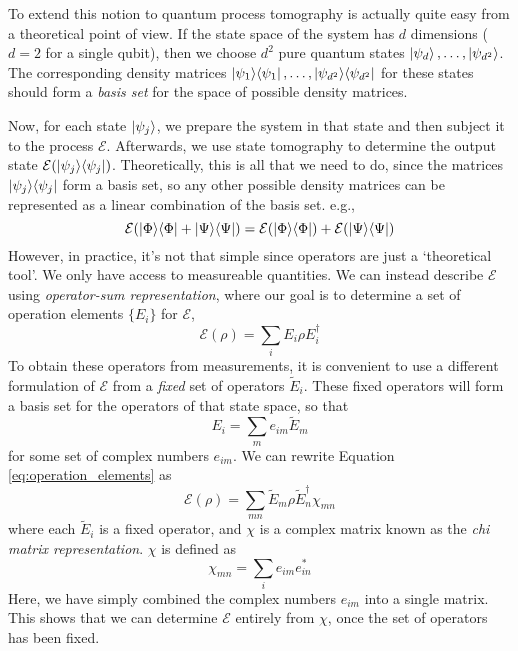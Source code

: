To extend this notion to quantum process tomography is actually quite easy from a theoretical point
of view. If the state space of the system has $d$ dimensions ($d = 2$ for a single qubit), then we
choose $d^2$ pure quantum states $\ket{\psi_d}, \dots, \ket{\psi_{d^2}}$. The corresponding density
matrices $\ket{\psi_1}\!\bra{\psi_1}, \dots, \ket{\psi_{d^2}}\!\bra{\psi_{d^2}}$ for these states should
form a \textit{basis set} for the space of possible density matrices. 

Now, for each state $\ket{\psi_j}$, we prepare the system in that state and then subject it to the
process $\mathcal{E}$. Afterwards, we use state tomography to determine the output state
$\mathcal{E}(\ket{\psi_j}\!\bra{\psi_j})$. Theoretically, this is all that we need to do, since the
matrices $\ket{\psi_j}\!\bra{\psi_j}$ form a basis set, so any other possible density matrices can be
represented as a linear combination of the basis set. e.g.,
\begin{equation}
    \mathcal{E}(\ket{\Phi}\!\bra{\Phi} + \ket{\Psi}\!\bra{\Psi}) = 
    \mathcal{E}(\ket{\Phi}\!\bra{\Phi}) + \mathcal{E}(\ket{\Psi}\!\bra{\Psi})
\end{equation}
However, in practice, it's not that simple since operators are just a `theoretical tool'. We only
have access to measureable quantities. We can instead describe $\mathcal{E}$ using
\textit{operator-sum representation}, where our goal is to determine a set of operation elements
$\{E_i\}$ for $\mathcal{E}$,
\begin{equation} \label{eq:operation_elements}
    \mathcal{E}(\rho) = \sum_i E_i \rho E_i^{\dagger} 
\end{equation}
To obtain these operators from measurements, it is convenient to use a different formulation of
$\mathcal{E}$ from a \textit{fixed} set of operators $\tilde{E}_i$. These fixed operators will form
a basis set for the operators of that state space, so that
\begin{equation}
    E_i = \sum_m e_{im} \tilde{E}_m
\end{equation}
for some set of complex numbers $e_{im}$. We can rewrite Equation \ref{eq:operation_elements} as
\begin{equation} \label{eq:chi_matrix_representation}
    \mathcal{E}(\rho) = \sum_{mn} \tilde{E}_m \rho \tilde{E}_n^{\dagger} \chi_{mn}
\end{equation}
where each $\tilde{E}_i$ is a fixed operator, and $\chi$ is a complex matrix known as the
\textit{chi matrix representation}. $\chi$ is defined as
\begin{equation}
    \chi_{mn} = \sum_i e_{im} e_{in}^*
\end{equation}
Here, we have simply combined the complex numbers $e_{im}$ into a single matrix. This shows that we
can determine $\mathcal{E}$ entirely from $\chi$, once the set of operators has been fixed. 

